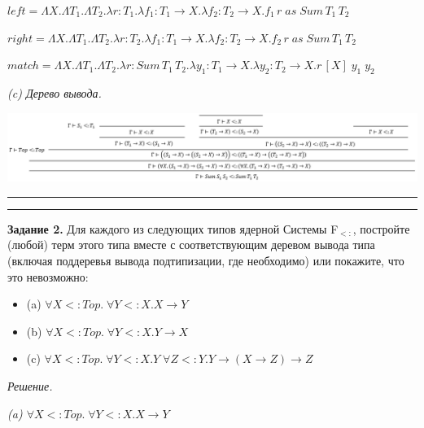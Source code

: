 \documentclass[landscape, 11pt]{report}
\begin{document}
	$left = \Lambda X. \Lambda T_1. \Lambda T_2. \lambda r: T_1. \lambda f_1 : T_1 \rightarrow X . \lambda f_2 : T_2 \rightarrow X . f_1 \, r \; as \; Sum \, T_1 \, T_2$
	
	$right = \Lambda X. \Lambda T_1. \Lambda T_2. \lambda r: T_2. \lambda f_1 : T_1 \rightarrow X . \lambda f_2 : T_2 \rightarrow X . f_2 \, r \; as \; Sum \, T_1 \, T_2$
	
	$match = \Lambda X . \Lambda T_1 . \Lambda T_2. \lambda r : Sum \, T_1 \, T_2 . \lambda y_1 : T_1 \rightarrow X . \lambda y_2 : T_2 \rightarrow X . r \, [X] \; y_1 \; y_2$
	
	\vspace{0.25cm}
	
	\textit{(c) Дерево вывода.}
	
	\begin{center}
		\includegraphics[scale=0.7]{solution}
	\end{center}

	\hrule
	
	\newpage
	
	
	\hrule
	\vspace{0.5cm}

	\textbf{Задание 2.} Для каждого из следующих типов ядерной Системы F$_{<:}$, постройте (любой) терм этого типа вместе с соответствующим деревом вывода типа (включая поддеревья вывода подтипизации, где необходимо) или покажите, что это невозможно:
	
	\begin{itemize}
		\item[] (a) $\forall X <: Top. \; \forall Y <: X . X \rightarrow Y$
		\item[] (b) $\forall X <: Top. \; \forall Y <: X . Y \rightarrow X$
		\item[] (c) $\forall X <: Top. \; \forall Y <: X . Y \; \forall Z <: Y. Y \rightarrow (X \rightarrow Z) \rightarrow Z$
	\end{itemize}
	
	\textit{Решение.}
	
	\vspace{0.2cm}
	
	\textit{(a) $\forall X <: Top. \; \forall Y <: X . X \rightarrow Y$}
	
\end{document}

